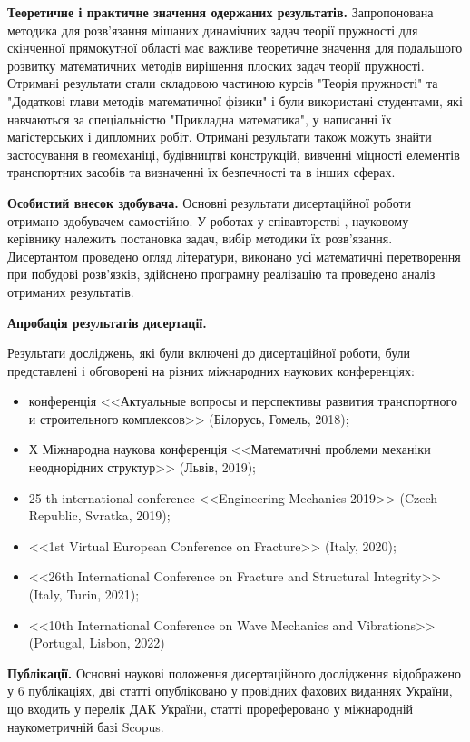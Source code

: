 \textbf{Теоретичне і практичне значення одержаних результатів.} 
Запропонована методика для розв'язання мішаних динамічних задач теорії пружності для скінченної прямокутної області має важливе теоретичне значення для подальшого розвитку математичних методів вирішення плоских задач теорії пружності.
Отримані результати стали складовою частиною курсів "Теорія пружності" та "Додаткові глави методів математичної фізики" і були використані студентами, які навчаються за спеціальністю "Прикладна математика", у написанні їх магістерських і дипломних робіт.
Отримані результати також можуть знайти застосування в геомеханіці, будівництві конструкцій, вивченні міцності елементів транспортних засобів та визначенні їх безпечності та в інших сферах.

\textbf{Особистий внесок здобувача.}
Основні результати дисертаційної роботи отримано здобувачем самостійно.
У роботах у співавторстві \cite{pozhylenkov_1, pozhylenkov_2, pozhylenkov_3, pozhylenkov_4, pozhylenkov_5, pozhylenkov_6},
науковому керівнику належить постановка задач, вибір методики їх розв’язання.
Дисертантом проведено огляд літератури, виконано усі математичні перетворення при побудові розв’язків,
здійснено програмну реалізацію та проведено аналіз отриманих результатів.

\textbf{Апробація результатів дисертації.}

Результати досліджень, які були включені до дисертаційної роботи, були представлені і обговорені на різних міжнародних наукових конференціях:
\begin{itemize}
    \item конференція  <<Актуальные вопросы и перспективы развития транспортного и строительного комплексов>> (Білорусь, Гомель, 2018);
    \item Х Міжнародна наукова конференція <<Математичні проблеми механіки неоднорідних структур>> (Львів, 2019);
    \item 25-th international conference <<Engineering Mechanics 2019>> (Czech Republic, Svratka, 2019);
    \item <<1st Virtual European Conference on Fracture>> (Italy, 2020);
    \item <<26th International Conference on Fracture and Structural Integrity>> (Italy, Turin, 2021);
    \item <<10th International Conference on Wave Mechanics and Vibrations>> (Portugal, Lisbon, 2022)
\end{itemize}

\textbf{Публікації.}
Основні наукові положення дисертаційного дослідження відображено у 6 публікаціях,
дві статті \cite{pozhylenkov_2,pozhylenkov_3} опубліковано у провідних фахових виданнях України, що входить у перелік ДАК України,
статті \cite{pozhylenkov_1,pozhylenkov_4,pozhylenkov_5,pozhylenkov_6} прореферовано у міжнародній наукометричній базі Scopus.

